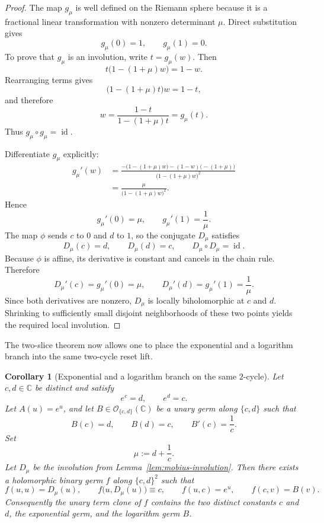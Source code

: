 \documentclass[11pt]{amsart}
\numberwithin{equation}{section}
\newtheorem{corollary}[theorem]{Corollary}
\theoremstyle{remark}
\theoremstyle{definition}
\newcommand{\C}{\mathbb{C}}
\newcommand{\Oc}{\mathcal{O}}
\newcommand{\id}{\operatorname{id}}
\begin{document}
\begin{proof}
The map $g_\mu$ is well defined on the Riemann sphere because it is a fractional linear transformation with nonzero determinant $\mu$. Direct substitution gives
\[
g_\mu(0)=1,\qquad g_\mu(1)=0.
\]
To prove that $g_\mu$ is an involution, write $t=g_\mu(w)$. Then
\[
t\bigl(1-(1+\mu)w\bigr)=1-w.
\]
Rearranging terms gives
\[
\bigl(1-(1+\mu)t\bigr)w=1-t,
\]
and therefore
\[
w=\frac{1-t}{1-(1+\mu)t}=g_\mu(t).
\]
Thus $g_\mu\circ g_\mu=\id$.

Differentiate $g_\mu$ explicitly:
\begin{align*}
g_\mu'(w)
&=\frac{-\bigl(1-(1+\mu)w\bigr)-(1-w)\bigl(-(1+\mu)\bigr)}{\bigl(1-(1+\mu)w\bigr)^2} \\
&=\frac{\mu}{\bigl(1-(1+\mu)w\bigr)^2}.
\end{align*}
Hence
\[
g_\mu'(0)=\mu,\qquad g_\mu'(1)=\frac{1}{\mu}.
\]
The map $\phi$ sends $c$ to $0$ and $d$ to $1$, so the conjugate $D_\mu$ satisfies
\[
D_\mu(c)=d,\qquad D_\mu(d)=c,\qquad D_\mu\circ D_\mu=\id.
\]
Because $\phi$ is affine, its derivative is constant and cancels in the chain rule. Therefore
\[
D_\mu'(c)=g_\mu'(0)=\mu,
\qquad
D_\mu'(d)=g_\mu'(1)=\frac{1}{\mu}.
\]
Since both derivatives are nonzero, $D_\mu$ is locally biholomorphic at $c$ and $d$. Shrinking to sufficiently small disjoint neighborhoods of these two points yields the required local involution.
\end{proof}

The two-slice theorem now allows one to place the exponential and a logarithm branch into the same two-cycle reset lift.

\begin{corollary}[Exponential and a logarithm branch on the same $2$-cycle]\label{cor:exp-log-two-cycle}
Let $c,d\in\C$ be distinct and satisfy
\[
e^c=d,\qquad e^d=c.
\]
Let $A(u)=e^u$, and let $B\in \Oc_{\{c,d\}}(\C)$ be a unary germ along $\{c,d\}$ such that
\[
B(c)=d,\qquad B(d)=c,
\qquad B'(c)=\frac{1}{c}.
\]
Set
\[
\mu:=d+\frac{1}{c}.
\]
Let $D_\mu$ be the involution from Lemma~\ref{lem:mobius-involution}. Then there exists a holomorphic binary germ $f$ along $\{c,d\}^2$ such that
\[
f(u,u)=D_\mu(u),\qquad f\bigl(u,D_\mu(u)\bigr)\equiv c,
\qquad f(u,c)=e^u,
\qquad f(c,v)=B(v).
\]
Consequently the unary term clone of $f$ contains the two distinct constants $c$ and $d$, the exponential germ, and the logarithm germ $B$.
\end{corollary}
\end{document}

